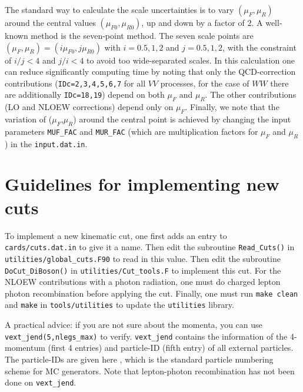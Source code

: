 \documentclass[english,12pt]{article}
\begin{document}
The standard way to calculate the scale uncertainties is to vary $(\mu_F, \mu_R)$ around the central values 
$(\mu_{F0}, \mu_{R0})$, up and down by a factor of $2$. A well-known method is the seven-point method. 
The seven scale points are $(\mu_F, \mu_R) = (i\mu_{F0}, j\mu_{R0})$ 
with $i=0.5,1,2$ and $j=0.5,1,2$, with the constraint of $i/j < 4$ and $j/i < 4$ to avoid too wide-separated scales. 
In this calculation one can reduce significantly computing time by noting that only the QCD-correction 
contributions ({\tt IDc=2,3,4,5,6,7} for all $VV$ processes, for the case of $WW$ there are 
additionally {\tt IDc=18,19}) depend on both $\mu_F$ and $\mu_R$. The other contributions (LO and NLOEW corrections) 
depend only on $\mu_F$. 
Finally, we note that the variation of ($\mu_{F}$,$\mu_{R}$) around the central point 
is achieved by changing the input parameters {\tt MUF\_FAC} and {\tt MUR\_FAC} (which are multiplication factors for 
$\mu_F$ and $\mu_R$) in the {\tt input.dat.in}.
\section{Guidelines for implementing new cuts}
\label{sec:cuts}
To implement a new kinematic cut, one first adds an entry to {\tt cards/cuts.dat.in} to give it a name. 
Then edit the subroutine {\tt Read\_Cuts()} in {\tt utilities/global\_cuts.F90} to read in this value. 
Then edit the subroutine {\tt DoCut\_DiBoson()} in {\tt utilities/Cut\_tools.F} to implement this cut. 
For the NLOEW contributions with a photon radiation, one must do charged lepton photon recombination before applying the cut.
Finally, one must run {\tt make clean} and {\tt make} in {\tt tools/utilities} to update the {\tt utilities} library.

A practical advice: if you are not sure about the momenta, 
you can use \\
{\tt vext\_jend(5,nlegs\_max)} to verify. 
{\tt vext\_jend} contains the information of the 4-momentum (first 4 entries)
and particle-ID (fifth entry) of all external particles. The particle-IDs are given here \cite{ParticleDataGroup:1998hll}, which is 
the standard particle numbering scheme for MC generators. 
Note that lepton-photon recombination has not been done on {\tt vext\_jend}.
\end{document}

